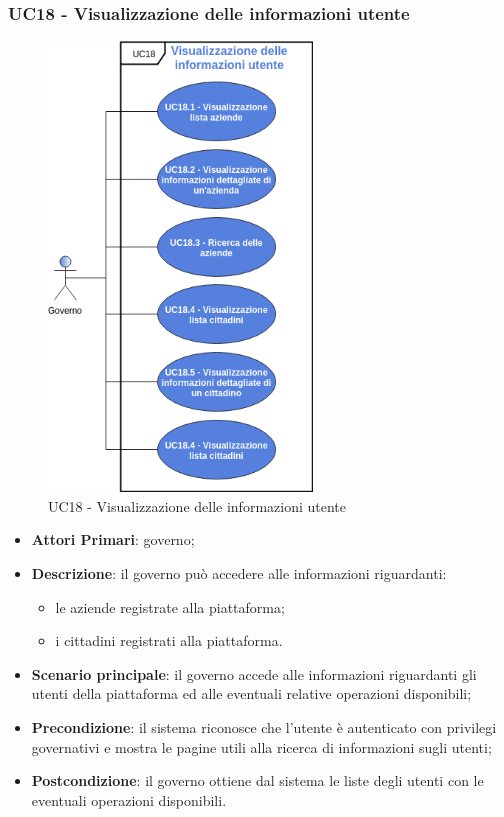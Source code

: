 \subsubsection{UC18 - Visualizzazione delle informazioni utente}
 \begin{figure}[h]
 	\includegraphics[width=7cm]{res/images/UC18.png}
 	\centering
 	\caption{UC18 - Visualizzazione delle informazioni utente}
 	
 \end{figure}
 \begin{itemize}
 	\item \textbf{Attori Primari}: governo;
 	\item \textbf{Descrizione}: il governo può accedere alle informazioni riguardanti:
 	\begin{itemize}
 		\item le aziende registrate alla piattaforma;
 		\item i cittadini registrati alla piattaforma.

 	\end{itemize}
 	\item \textbf{Scenario principale}: il governo accede alle informazioni riguardanti gli utenti della piattaforma ed alle eventuali relative operazioni disponibili;

 	\item \textbf{Precondizione}: il sistema riconosce che l'utente è autenticato con privilegi governativi e mostra le pagine utili alla ricerca di informazioni sugli utenti;
 	
 	\item \textbf{Postcondizione}: il governo ottiene dal sistema le liste degli utenti con le eventuali operazioni disponibili.
 \end{itemize}

